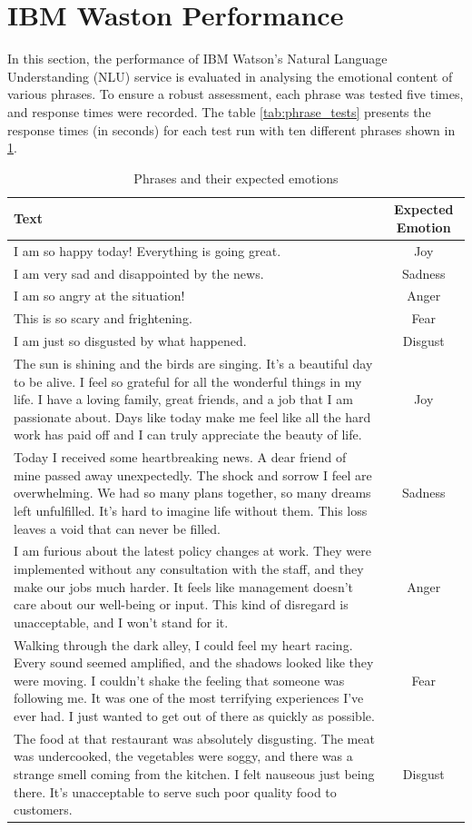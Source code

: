 \section{IBM Waston Performance}

In this section, the performance of IBM Watson's Natural Language Understanding (NLU) service is evaluated in analysing the emotional content of various phrases. To ensure a robust assessment, each phrase was tested five times, and response times were recorded. The table \ref{tab:phrase_tests} presents the response times (in seconds) for each test run with ten different phrases shown in \ref{tab:phrases_emotions}.

\begin{table}[h!]
\centering{}
\caption{Phrases and their expected emotions}
\begin{tabular}{|p{9cm}|c|}
\hline
\textbf{Text} & \textbf{Expected Emotion} \\ \hline
I am so happy today! Everything is going great. & Joy \\ \hline
I am very sad and disappointed by the news. & Sadness \\ \hline
I am so angry at the situation! & Anger \\ \hline
This is so scary and frightening. & Fear \\ \hline
I am just so disgusted by what happened. & Disgust \\ \hline
The sun is shining and the birds are singing. It's a beautiful day to be alive. I feel so grateful for all the wonderful things in my life. I have a loving family, great friends, and a job that I am passionate about. Days like today make me feel like all the hard work has paid off and I can truly appreciate the beauty of life. & Joy \\ \hline
Today I received some heartbreaking news. A dear friend of mine passed away unexpectedly. The shock and sorrow I feel are overwhelming. We had so many plans together, so many dreams left unfulfilled. It's hard to imagine life without them. This loss leaves a void that can never be filled. & Sadness \\ \hline
I am furious about the latest policy changes at work. They were implemented without any consultation with the staff, and they make our jobs much harder. It feels like management doesn't care about our well-being or input. This kind of disregard is unacceptable, and I won't stand for it. & Anger \\ \hline
Walking through the dark alley, I could feel my heart racing. Every sound seemed amplified, and the shadows looked like they were moving. I couldn't shake the feeling that someone was following me. It was one of the most terrifying experiences I've ever had. I just wanted to get out of there as quickly as possible. & Fear \\ \hline
The food at that restaurant was absolutely disgusting. The meat was undercooked, the vegetables were soggy, and there was a strange smell coming from the kitchen. I felt nauseous just being there. It's unacceptable to serve such poor quality food to customers. & Disgust \\ \hline
\end{tabular}
\label{tab:phrases_emotions}
\end{table}
